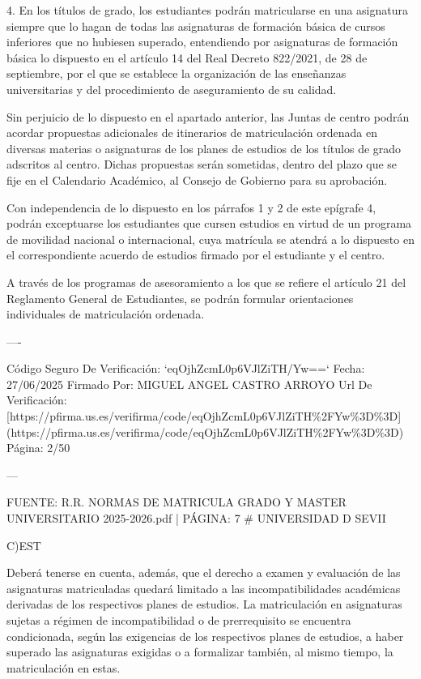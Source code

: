 \documentclass{article}
\begin{document}
\begin{itemize}
\begin{itemize}
\begin{scriptsize}
                  4. En los títulos de grado, los estudiantes podrán matricularse en una asignatura siempre que lo hagan de todas las asignaturas de formación básica de cursos inferiores que no hubiesen superado, entendiendo por asignaturas de formación básica lo dispuesto en el artículo 14 del Real Decreto 822/2021, de 28 de septiembre, por el que se establece la organización de las enseñanzas universitarias y del procedimiento de aseguramiento de su calidad.

                  Sin perjuicio de lo dispuesto en el apartado anterior, las Juntas de centro podrán acordar propuestas adicionales de itinerarios de matriculación ordenada en diversas materias o asignaturas de los planes de estudios de los títulos de grado adscritos al centro. Dichas propuestas serán sometidas, dentro del plazo que se fije en el Calendario Académico, al Consejo de Gobierno para su aprobación.

                  Con independencia de lo dispuesto en los párrafos 1 y 2 de este epígrafe 4, podrán exceptuarse los estudiantes que cursen estudios en virtud de un programa de movilidad nacional o internacional, cuya matrícula se atendrá a lo dispuesto en el correspondiente acuerdo de estudios firmado por el estudiante y el centro.

                  A través de los programas de asesoramiento a los que se refiere el artículo 21 del Reglamento General de Estudiantes, se podrán formular orientaciones individuales de matriculación ordenada.

                  ----

                  Código Seguro De Verificación: `eqOjhZcmL0p6VJlZiTH/Yw==`
                  Fecha: 27/06/2025
                  Firmado Por: MIGUEL ANGEL CASTRO ARROYO
                  Url De Verificación: [https://pfirma.us.es/verifirma/code/eqOjhZcmL0p6VJlZiTH\%2FYw\%3D\%3D](https://pfirma.us.es/verifirma/code/eqOjhZcmL0p6VJlZiTH\%2FYw\%3D\%3D)
                  Página: 2/50

                  ---

                  FUENTE: R.R. NORMAS DE MATRICULA GRADO Y MASTER UNIVERSITARIO 2025-2026.pdf | PÁGINA: 7
                  \# UNIVERSIDAD D SEVII

                  C)EST

                  Deberá tenerse en cuenta, además, que el derecho a examen y evaluación de las asignaturas matriculadas quedará limitado a las incompatibilidades académicas derivadas de los respectivos planes de estudios. La matriculación en asignaturas sujetas a régimen de incompatibilidad o de prerrequisito se encuentra condicionada, según las exigencias de los respectivos planes de estudios, a haber superado las asignaturas exigidas o a formalizar también, al mismo tiempo, la matriculación en estas.


\end{scriptsize}
\end{itemize}
\end{itemize}
\end{document}
